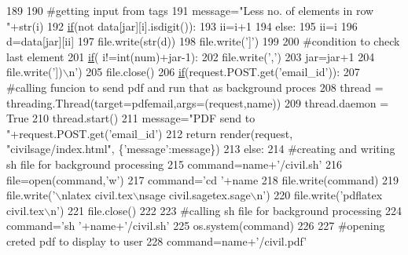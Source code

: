 \begin{DoxyCode}
189 
190                 \textcolor{comment}{#getting input from tags}
191                 message=\textcolor{stringliteral}{"Less no. of elements in row "}+str(i)
192                 \hyperlink{bootstrap_8min_8js_ac2d69f5011896c6ed4a54e0dd36f6334}{if}(\textcolor{keywordflow}{not} data[jar][i].isdigit()):
193                     ii=i+1
194                 \textcolor{keywordflow}{else}:
195                     ii=i
196                 d=data[jar][ii]
197                 file.write(str(d))
198                 file.write(\textcolor{stringliteral}{']'})
199 
200                 \textcolor{comment}{#condition to check last element}
201                 \hyperlink{bootstrap_8min_8js_ac2d69f5011896c6ed4a54e0dd36f6334}{if}( i!=int(num)+jar-1):
202                     file.write(\textcolor{stringliteral}{','})
203             jar=jar+1
204             file.write(\textcolor{stringliteral}{'])\(\backslash\)n'})
205         file.close()
206         \hyperlink{bootstrap_8min_8js_ac2d69f5011896c6ed4a54e0dd36f6334}{if}(request.POST.get(\textcolor{stringliteral}{'email\_id'})):
207             \textcolor{comment}{#calling funcion to send pdf and run that as background proces}
208             thread = threading.Thread(target=pdfemail,args=(request,name))
209             thread.daemon = \textcolor{keyword}{True}
210             thread.start()
211             message=\textcolor{stringliteral}{"PDF send to "}+request.POST.get(\textcolor{stringliteral}{'email\_id'})
212             \textcolor{keywordflow}{return} render(request, \textcolor{stringliteral}{"civilsage/index.html"}, \{\textcolor{stringliteral}{'message'}:message\})
213         \textcolor{keywordflow}{else}:
214             \textcolor{comment}{#creating and writing sh file for background processing}
215             command=name+\textcolor{stringliteral}{'/civil.sh'}
216             file=open(command,\textcolor{stringliteral}{'w'})
217             command=\textcolor{stringliteral}{'cd '}+name
218             file.write(command)
219             file.write(\textcolor{stringliteral}{'\(\backslash\)nlatex civil.tex\(\backslash\)nsage civil.sagetex.sage\(\backslash\)n'})
220             file.write(\textcolor{stringliteral}{'pdflatex civil.tex\(\backslash\)n'})
221             file.close()
222 
223             \textcolor{comment}{#calling sh file for background processing}
224             command=\textcolor{stringliteral}{'sh '}+name+\textcolor{stringliteral}{'/civil.sh'}
225             os.system(command)
226 
227             \textcolor{comment}{#opening creted pdf to display to user}
228             command=name+\textcolor{stringliteral}{'/civil.pdf'}

\end{DoxyCode}
